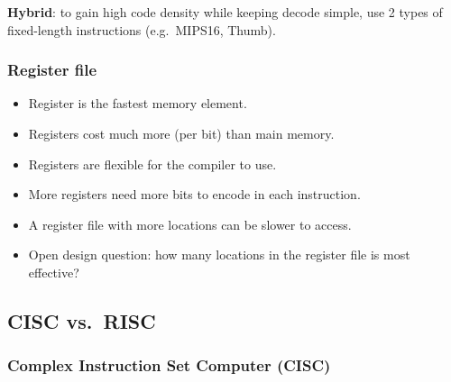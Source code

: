 \begin{note}
\textbf{Hybrid}: to gain high code density while keeping decode simple, use
2 types of fixed-length instructions (e.g.\ MIPS16, Thumb).
\end{note}

\subsubsection{Register file}

\begin{itemize}
  \item Register is the fastest memory element.
  \item Registers cost much more (per bit) than main memory.
  \item Registers are flexible for the compiler to use.
  \item More registers need more bits to encode in each instruction.
  \item A register file with more locations can be slower to access.
  \item Open design question: how many locations in the register file is
  most effective?
\end{itemize}

\subsection{CISC vs.\ RISC}

\subsubsection{Complex Instruction Set Computer (CISC)}

